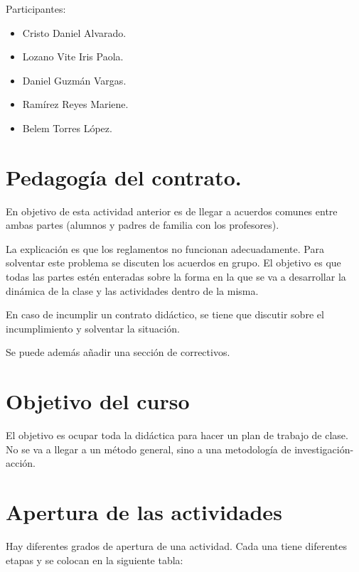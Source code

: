 \documentclass[12pt]{report}
\theoremstyle{largebreak}
\begin{document}
    Participantes:

    \begin{itemize}
        \item Cristo Daniel Alvarado.
        \item Lozano Vite Iris Paola.
        \item Daniel Guzmán Vargas.
        \item Ramírez Reyes Mariene.
        \item Belem Torres López.
    \end{itemize}


    \section{Pedagogía del contrato.}

    En objetivo de esta actividad anterior es de llegar a acuerdos comunes entre ambas partes (alumnos y padres de familia con los profesores).

    La explicación es que los reglamentos no funcionan adecuadamente. Para solventar este problema se discuten los acuerdos en grupo. El objetivo es que todas las partes estén enteradas sobre la forma en la que se va a desarrollar la dinámica de la clase y las actividades dentro de la misma.

    \begin{obs}
        En caso de incumplir un contrato didáctico, se tiene que discutir sobre el incumplimiento y solventar la situación.
    \end{obs}

    Se puede además añadir una sección de correctivos.

    \newpage

    \section{Objetivo del curso}

    El objetivo es ocupar toda la didáctica para hacer un plan de trabajo de clase. No se va a llegar a un método general, sino a una metodología de investigación-acción.

    \section{Apertura de las actividades}

    Hay diferentes grados de apertura de una actividad. Cada una tiene diferentes etapas y se colocan en la siguiente tabla:
\end{document}

